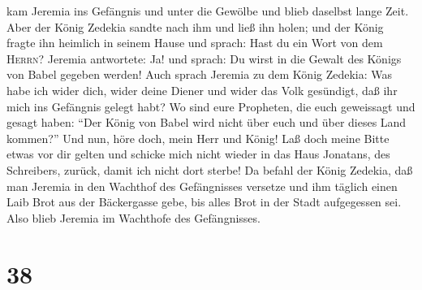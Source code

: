kam Jeremia ins Gefängnis und unter die Gewölbe und blieb daselbst lange
Zeit.  Aber der König Zedekia sandte nach ihm und ließ
ihn holen; und der König fragte ihn heimlich in seinem Hause und sprach:
Hast du ein Wort von dem \textsc{Herrn}? Jeremia antwortete: Ja! und
sprach: Du wirst in die Gewalt des Königs von Babel gegeben werden!
 Auch sprach Jeremia zu dem König Zedekia: Was habe ich
wider dich, wider deine Diener und wider das Volk gesündigt, daß ihr
mich ins Gefängnis gelegt habt?  Wo sind eure Propheten,
die euch geweissagt und gesagt haben: ``Der König von Babel wird nicht
über euch und über dieses Land kommen?''  Und nun, höre
doch, mein Herr und König! Laß doch meine Bitte etwas vor dir gelten und
schicke mich nicht wieder in das Haus Jonatans, des Schreibers, zurück,
damit ich nicht dort sterbe!  Da befahl der König
Zedekia, daß man Jeremia in den Wachthof des Gefängnisses versetze und
ihm täglich einen Laib Brot aus der Bäckergasse gebe, bis alles Brot in
der Stadt aufgegessen sei. Also blieb Jeremia im Wachthofe des
Gefängnisses.

\hypertarget{section-37}{%
\section{38}\label{section-37}}


